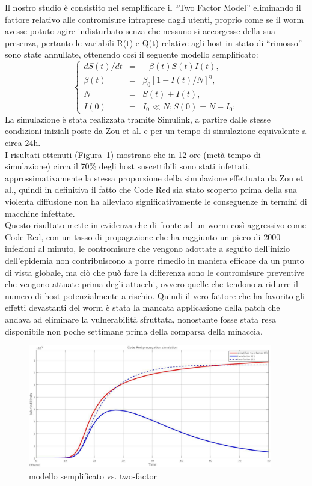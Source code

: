 Il nostro studio è consistito nel semplificare il “Two Factor Model” eliminando il fattore relativo alle contromisure intraprese dagli utenti, proprio come se il worm avesse potuto agire indisturbato senza che nessuno si accorgesse della sua presenza, pertanto le variabili  R(t) e Q(t) relative agli host in stato di “rimosso” sono state annullate, ottenendo così il seguente modello semplificato:
\begin{equation}
\left\{  \begin{array}{rcl} 
                dS(t)/dt &=& -\beta(t)S(t)I(t), \\ 
                \beta(t) &=& \beta_{0}[1 - I(t)/N]^{\eta}, \\ 
                N &=& S(t) + I(t), \\
                I(0) &=& I_{0} \ll N; S(0) = N -I_{0}; 
           \end{array}  \right.
\end{equation}
La simulazione è stata realizzata tramite Simulink, a partire dalle stesse condizioni iniziali poste da Zou et al. e per un tempo di simulazione equivalente a circa 24h.\\
I risultati ottenuti (Figura~\ref{simpler}) mostrano che in 12 ore (metà tempo di simulazione) circa il 70\% degli host suscettibili sono stati infettati, approssimativamente la stessa proporzione della simulazione effettuata da Zou et al., quindi in definitiva il fatto che Code Red sia stato scoperto prima della sua violenta diffusione non ha alleviato significativamente le conseguenze in termini di macchine infettate.\\
Questo risultato mette in evidenza che di fronte ad un worm così aggressivo come Code Red, con un tasso di propagazione che ha raggiunto un picco di 2000 infezioni al minuto, le contromisure che vengono adottate a seguito dell’inizio dell’epidemia non contribuiscono a porre rimedio in maniera efficace da un punto di vista globale, ma ciò che può fare la differenza sono le contromisure preventive che vengono attuate prima degli attacchi, ovvero quelle che tendono a ridurre il numero di host potenzialmente a rischio. Quindi il vero fattore che ha favorito gli effetti devastanti del worm è stata la mancata applicazione della patch che andava ad eliminare la vulnerabilità sfruttata, nonostante fosse stata resa disponibile non poche settimane prima della comparsa della minaccia.\\
\begin{figure}[!h]
\centering
\includegraphics[width=0.95\textwidth]{images/simpler.eps}
\caption{modello semplificato vs. two-factor}
\label{simpler}
\end{figure}
